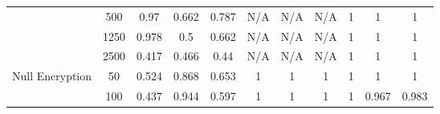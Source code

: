 \begin{table*}[]
{\begin{tabular}{ccccccccccc}
			\multicolumn{1}{|c|}{}                                            & \multicolumn{1}{c|}{500}           & \multicolumn{1}{c|}{0.97}                    & \multicolumn{1}{c|}{0.662}                & \multicolumn{1}{c|}{0.787}            & \multicolumn{1}{c|}{N/A}                      & \multicolumn{1}{c|}{N/A}                   & \multicolumn{1}{c|}{N/A}               & \multicolumn{1}{c|}{1}                      & \multicolumn{1}{c|}{1}                   & \multicolumn{1}{c|}{1}               \\ \cline{2-11}
			\multicolumn{1}{|c|}{}                                            & \multicolumn{1}{c|}{1250}          & \multicolumn{1}{c|}{0.978}                   & \multicolumn{1}{c|}{0.5}                  & \multicolumn{1}{c|}{0.662}            & \multicolumn{1}{c|}{N/A}                        & \multicolumn{1}{c|}{N/A}                     & \multicolumn{1}{c|}{N/A}                 & \multicolumn{1}{c|}{1}                      & \multicolumn{1}{c|}{1}                   & \multicolumn{1}{c|}{1}               \\ \cline{2-11}
			\multicolumn{1}{|c|}{}                                            & \multicolumn{1}{c|}{2500}          & \multicolumn{1}{c|}{0.417}                   & \multicolumn{1}{c|}{0.466}                & \multicolumn{1}{c|}{0.44}             & \multicolumn{1}{c|}{N/A}                        & \multicolumn{1}{c|}{N/A}                     & \multicolumn{1}{c|}{N/A}                 & \multicolumn{1}{c|}{1}                      & \multicolumn{1}{c|}{1}                   & \multicolumn{1}{c|}{1}               \\ \hline
			\multicolumn{1}{|c|}{\multirow{6}{*}{Null Encryption}}            & \multicolumn{1}{c|}{50}            & \multicolumn{1}{c|}{0.524}                   & \multicolumn{1}{c|}{0.868}                & \multicolumn{1}{c|}{0.653}            & \multicolumn{1}{c|}{1}                      & \multicolumn{1}{c|}{1}                   & \multicolumn{1}{c|}{1}               & \multicolumn{1}{c|}{1}                      & \multicolumn{1}{c|}{1}                   & \multicolumn{1}{c|}{1}               \\ \cline{2-11}
			\multicolumn{1}{|c|}{}                                            & \multicolumn{1}{c|}{100}           & \multicolumn{1}{c|}{0.437}                   & \multicolumn{1}{c|}{0.944}                & \multicolumn{1}{c|}{0.597}            & \multicolumn{1}{c|}{1}                        & \multicolumn{1}{c|}{1}                     & \multicolumn{1}{c|}{1}                 & \multicolumn{1}{c|}{1}                      & \multicolumn{1}{c|}{0.967}               & \multicolumn{1}{c|}{0.983}           \\ \cline{2-11}

\end{tabular}}
\end{table*}
